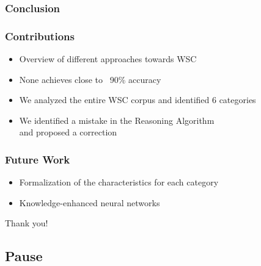 \documentclass[c,8pt,xcolor...,x11names]{beamer}
\begin{document}
\subsubsection{Conclusion}

\begin{frame}[fragile] \frametitle{Contributions}
  \begin{itemize}
	\normalsize
	\item Overview of different approaches towards WSC
	\item None achieves close to ~90\% accuracy 
	\item We \alert{analyzed} the entire WSC corpus and identified 6 categories
	\item We identified a mistake in the Reasoning Algorithm \\and proposed a correction    
\end{itemize}
\end{frame}

\begin{frame}[fragile]
 \frametitle{Future Work}
 \begin{itemize}
 	\normalsize
 	\item Formalization of the characteristics for each category
 	\item Knowledge-enhanced neural networks
\end{itemize}	
\end{frame}


\begin{frame}
	\vfill
	\begin{LARGE}
		\hfill Thank you! \hfill 
	\end{LARGE}
	\vfill
\end{frame}
\subsection{Pause}
\end{document}
